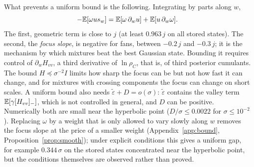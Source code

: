 What prevents a uniform bound is the following. Integrating by parts along $w$,
\begin{equation}
-\mathbb{E}[\omega u s_w] = \mathbb{E}[\omega\,\partial_w u] + \mathbb{E}[u\,\partial_w\omega] .
\label{eq:ibp}
\end{equation}
The first, geometric term is close to $j$ (at least $0.963\,j$ on all stored states). The second, the \emph{focus slope}, is negative for fans, between $-0.2\,j$ and $-0.3\,j$; it is the mechanism by which mixtures beat the best Gaussian state. Bounding it requires control of $\partial_w H_{vv}$, a third derivative of $\ln\rho_C$, that is, of third posterior cumulants. The bound $H \preceq \sigma^{-2}I$ limits how sharp the focus can be but not how fast it can change, and for mixtures with crossing components the focus can change on short scales. A uniform bound also needs $\tilde\varepsilon + D = o(\sigma)$: $\tilde\varepsilon$ contains the valley term $\mathbb{E}[\gamma[H_{vv}]_-]$, which is not controlled in general, and $D$ can be positive. Numerically both are small near the hyperbolic point ($D/\sigma \leq 0.0022$ for $\sigma \leq 10^{-2}$). Replacing $\omega$ by a weight that is only allowed to vary slowly along $w$ removes the focus slope at the price of a smaller weight (Appendix~\ref{app:bound}, Proposition~\ref{prop:smooth}); under explicit conditions this gives a uniform gap, for example $0.344\,\sigma$ on the stored states concentrated near the hyperbolic point, but the conditions themselves are observed rather than proved.
